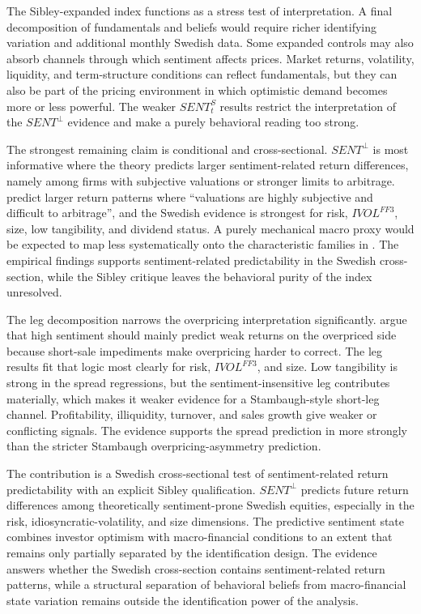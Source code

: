 \documentclass[11pt]{article}
\newcommand{\var}[1]{\ensuremath{#1}}
\begin{document}
The Sibley-expanded index functions as a stress test of interpretation. A final decomposition of fundamentals and beliefs would require richer identifying variation and additional monthly Swedish data. Some expanded controls may also absorb channels through which sentiment affects prices. Market returns, volatility, liquidity, and term-structure conditions can reflect fundamentals, but they can also be part of the pricing environment in which optimistic demand becomes more or less powerful. The weaker \var{SENT^{S}_{t}} results restrict the interpretation of the \var{SENT^{\perp}} evidence and make a purely behavioral reading too strong.

The strongest remaining claim is conditional and cross-sectional. \var{SENT^{\perp}} is most informative where the theory predicts larger sentiment-related return differences, namely among firms with subjective valuations or stronger limits to arbitrage. \citet{baker2006sentiment} predict larger return patterns where \enquote{valuations are highly subjective and difficult to arbitrage}, and the Swedish evidence is strongest for risk, \var{IVOL^{FF3}}, size, low tangibility, and dividend status. A purely mechanical macro proxy would be expected to map less systematically onto the characteristic families in \citet{baker2006sentiment}. The empirical findings supports sentiment-related predictability in the Swedish cross-section, while the Sibley critique leaves the behavioral purity of the index unresolved.

The leg decomposition narrows the overpricing interpretation significantly. \citet{stambaugh2012short} argue that high sentiment should mainly predict weak returns on the overpriced side because short-sale impediments make overpricing harder to correct. The leg results fit that logic most clearly for risk, \var{IVOL^{FF3}}, and size. Low tangibility is strong in the spread regressions, but the sentiment-insensitive leg contributes materially, which makes it weaker evidence for a Stambaugh-style short-leg channel. Profitability, illiquidity, turnover, and sales growth give weaker or conflicting signals. The evidence supports the spread prediction in \citet{baker2006sentiment} more strongly than the stricter Stambaugh overpricing-asymmetry prediction.

The contribution is a Swedish cross-sectional test of sentiment-related return predictability with an explicit Sibley qualification. \var{SENT^{\perp}} predicts future return differences among theoretically sentiment-prone Swedish equities, especially in the risk, idiosyncratic-volatility, and size dimensions. The predictive sentiment state combines investor optimism with macro-financial conditions to an extent that remains only partially separated by the identification design. The evidence answers whether the Swedish cross-section contains sentiment-related return patterns, while a structural separation of behavioral beliefs from macro-financial state variation remains outside the identification power of the analysis.
\end{document}

